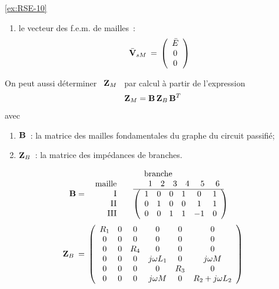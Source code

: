 \begin{solexercise}{\ref{ex:RSE-10}}
\begin{enumerate}
	\item le vecteur des f.e.m. de mailles~:
	\[ \bar{\bf V}_{sM} \: = \, \left( 
	\begin{array}{c} \bar{E} \\ 0 \\ 0 \end{array} \right) \]
\end{enumerate}
On peut aussi déterminer  \ ${\bf Z}_M$ \ par calcul à partir de l'expression
\[ {\bf Z}_M = {\bf B} \, {\bf Z}_B \, {\bf B}^T \]
avec\\
\begin{enumerate}
	\item ${\bf B}$~: la matrice des mailles fondamentales  du graphe du circuit passifié;
	\item ${\bf Z}_B$~: la matrice des impédances de branches.
\end{enumerate}
\[ {\bf B} =   
\begin{array}[b]{rl}
\begin{array}{r} \\ \mbox{maille} \\ \mbox{I} \\ \mbox{II} \\ \mbox{III} \end{array} & 
\begin{array}{l}
\mbox{~~~~branche}\\
\begin{array}{cccccc}
~~~~1 & 2 & 3 & 4 & ~5 & ~6 \\\hline
\end{array}\\
\left( \begin{array}{cccccc}
1 & 0 & 0 & 1 & 0 & 1\\
0 & 1 & 0 & 0 & 1 & 1\\
0 & 0 & 1 & 1 & -1 & 0
\end{array}\right)
\end{array}
\end{array}\]
\[ {\bf Z}_B \: = \, \left( \begin{array}{cccccc}
R_1 & 0 & 0 & 0 & 0 & 0\\
0 & 0 & 0 & 0 & 0 & 0\\
0 & 0 & R_4 & 0 & 0 & 0\\
0 & 0 & 0 & j\omega L_1 & 0 & j\omega M\\
0 & 0 & 0 & 0 & R_3 & 0\\
0 & 0 & 0 & j\omega M & 0 & R_2 + j\omega L_2
\end{array} \right) \]



\end{solexercise}
